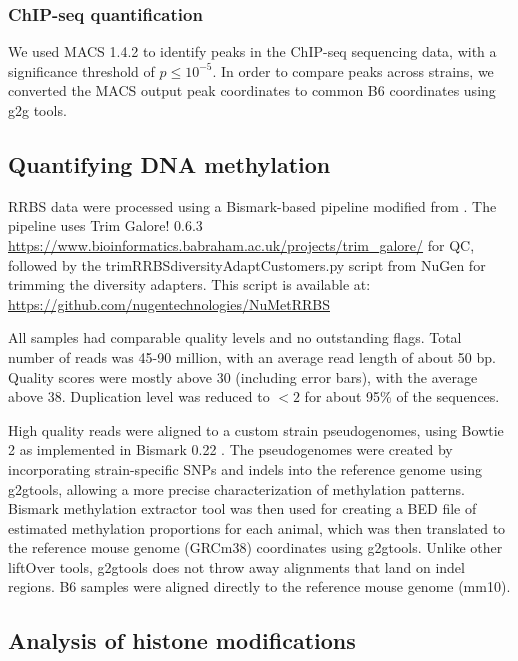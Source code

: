 \documentclass[
  11pt,
]{article}
\begin{document}
\hypertarget{chip-seq-quantification}{%
\subsubsection{ChIP-seq quantification}\label{chip-seq-quantification}}

We used MACS 1.4.2 \citep{pmid18798982} to identify peaks in the
ChIP-seq sequencing data, with a significance threshold of
\(p \leq 10^{-5}\). In order to compare peaks across strains, we
converted the MACS output peak coordinates to common B6 coordinates
using g2g tools.

\hypertarget{quantifying-dna-methylation}{%
\subsection{Quantifying DNA
methylation}\label{quantifying-dna-methylation}}

RRBS data were processed using a Bismark-based pipeline modified from
\citep{pmid30348905}. The pipeline uses Trim Galore! 0.6.3
\url{https://www.bioinformatics.babraham.ac.uk/projects/trim_galore/}
for QC, followed by the trimRRBSdiversityAdaptCustomers.py script from
NuGen for trimming the diversity adapters. This script is available at:
\url{https://github.com/nugentechnologies/NuMetRRBS}

All samples had comparable quality levels and no outstanding flags.
Total number of reads was 45-90 million, with an average read length of
about 50 bp. Quality scores were mostly above 30 (including error bars),
with the average above 38. Duplication level was reduced to \(<2\) for
about 95\% of the sequences.

High quality reads were aligned to a custom strain pseudogenomes, using
Bowtie 2 as implemented in Bismark 0.22 \citep{pmid21493656}. The
pseudogenomes were created by incorporating strain-specific SNPs and
indels into the reference genome using g2gtools, allowing a more precise
characterization of methylation patterns. Bismark methylation extractor
tool was then used for creating a BED file of estimated methylation
proportions for each animal, which was then translated to the reference
mouse genome (GRCm38) coordinates using g2gtools. Unlike other liftOver
tools, g2gtools does not throw away alignments that land on indel
regions. B6 samples were aligned directly to the reference mouse genome
(mm10).

\hypertarget{analysis-of-histone-modifications}{%
\subsection{Analysis of histone
modifications}\label{analysis-of-histone-modifications}}
\end{document}
